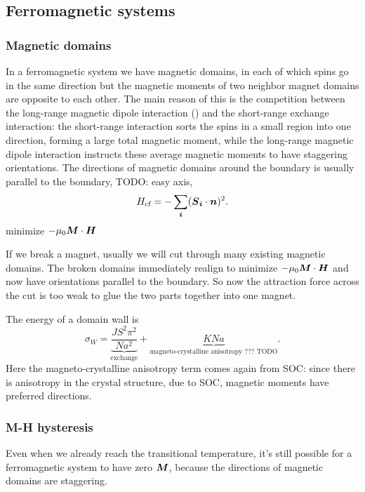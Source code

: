 \documentclass[hyperref, a4paper]{article}
\begin{document}
\subsection{Ferromagnetic systems}

\subsubsection{Magnetic domains}

In a ferromagnetic system 
we have magnetic domains, 
in each of which spins go in the same direction 
but the magnetic moments of two neighbor magnet domains
are opposite to each other.
The main reason of this is the competition between 
the long-range magnetic dipole interaction ()
and the short-range exchange interaction:
the short-range interaction sorts the spins in a small region into one direction,
forming a large total magnetic moment,
while the long-range magnetic dipole interaction 
instructs these average magnetic moments to have staggering orientations.
The directions of magnetic domains around the boundary is usually parallel to the boundary,
TODO: easy axis, 
\begin{equation}
    H_{\text{cf}} = - \sum_{\vb*{i}} (\vb*{S}_{\vb*{i}} \cdot \vb*{n})^2.
\end{equation}
minimize $- \mu_0 \vb*{M} \cdot \vb*{H}$

If we break a magnet,
usually we will cut through many existing magnetic domains.
The broken domains immediately 
realign to minimize $- \mu_0 \vb*{M} \cdot \vb*{H}$
and now have orientations parallel to the boundary.
So now the attraction force across the cut 
is too weak to glue the two parts together into one magnet.

The energy of a domain wall is 
\begin{equation}
    \sigma_W = \underbrace{\frac{J S^2 \pi^2}{N a^2}}_{\text{exchange}} 
    + \underbrace{KNa}_\text{magneto-crystalline anisotropy ??? TODO}.
\end{equation}
Here the magneto-crystalline anisotropy term comes again from SOC: 
since there is anisotropy in the crystal structure, 
due to SOC, 
magnetic moments have preferred directions.

\subsubsection{M-H hysteresis}

Even when we already reach the transitional temperature,
it's still possible for a ferromagnetic system to have zero $\vb*{M}$,
because the directions of magnetic domains are staggering.
\end{document}
